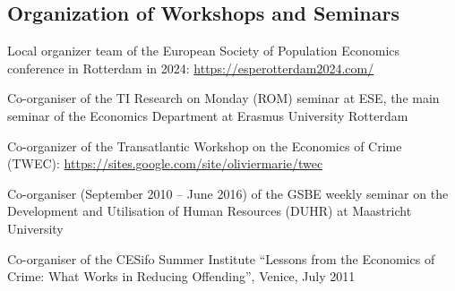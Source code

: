 \documentclass[11pt,a4paper]{article}
\begin{document}
\subsection{Organization of Workshops and Seminars}
\begin{pubs}
  \item Local organizer team of the European Society of Population Economics conference in Rotterdam in 2024: \url{https://esperotterdam2024.com/}
  \item Co-organiser of the TI Research on Monday (ROM) seminar at ESE, the main seminar of the Economics Department at Erasmus University Rotterdam
  \item Co-organizer of the Transatlantic Workshop on the Economics of Crime (TWEC): \url{https://sites.google.com/site/oliviermarie/twec}
  \item Co-organiser (September 2010 -- June 2016) of the GSBE weekly seminar on the Development and Utilisation of Human Resources (DUHR) at Maastricht University
  \item Co-organiser of the CESifo Summer Institute ``Lessons from the Economics of Crime: What Works in Reducing Offending'', Venice, July 2011
\end{pubs}
\end{document}
